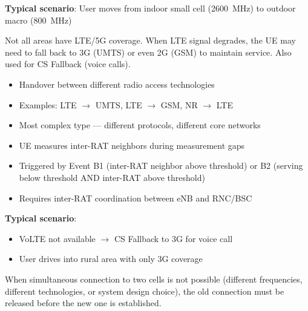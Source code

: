 \textbf{Typical scenario}: User moves from indoor small cell (2600~MHz) to outdoor macro (800~MHz)



\CNchained{}

Not all areas have LTE/\allowbreak{}5G coverage. When LTE signal degrades, the UE may need to fall back to 3G (UMTS) or even 2G (GSM) to maintain service. Also used for CS Fallback (voice calls).


\begin{itemize}
\tightlist
\item
  Handover between different radio access technologies
\item
  Examples: LTE \ensuremath{\to} UMTS, LTE \ensuremath{\to} GSM, NR \ensuremath{\to} LTE
\item
  Most complex type — different protocols, different core networks
\end{itemize}


\begin{itemize}
\tightlist
\item
  UE measures inter-RAT neighbors during measurement gaps
\item
  Triggered by Event B1 (inter-RAT neighbor above threshold) or B2 (serving below threshold AND inter-RAT above threshold)
\item
  Requires inter-RAT coordination between eNB and RNC/\allowbreak{}BSC
\end{itemize}

\textbf{Typical scenario}:

\begin{itemize}
\tightlist
\item
  VoLTE not available \ensuremath{\to} CS Fallback to 3G for voice call
\item
  User drives into rural area with only 3G coverage
\end{itemize}



\CNchained{}

When simultaneous connection to two cells is not possible (different frequencies, different technologies, or system design choice), the old connection must be released before the new one is established.

